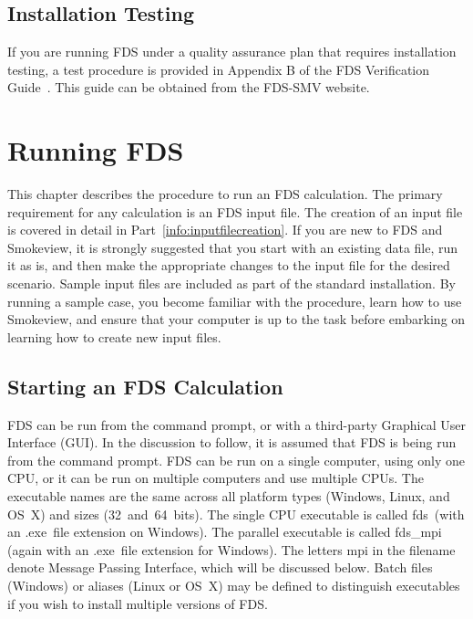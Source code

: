 \documentclass[11pt]{book}
\begin{document}
\section{Installation Testing}

If you are running FDS under a quality assurance plan that requires installation testing, a test procedure is provided in Appendix B of the FDS Verification Guide~\cite{FDS_Verification_Guide}.  This guide can be obtained from the FDS-SMV website.



\chapter{Running FDS}
\label{info:runningFDS}

This chapter describes the procedure to run an FDS calculation. The primary requirement for any calculation is an FDS input file. The creation of an input file is covered in detail in Part~\ref{info:inputfilecreation}. If you are new to FDS and Smokeview, it is strongly suggested that you start with an existing data file, run it as is, and then make the appropriate changes to the input file for the desired scenario. Sample input files are included as part of the standard installation. By running a sample case, you become familiar with the procedure, learn how to use Smokeview, and ensure that your computer is up to the task before embarking on learning how to create new input files.



\section{Starting an FDS Calculation}

FDS can be run from the command prompt, or with a third-party Graphical User Interface (GUI). In the discussion to follow, it is assumed that FDS is being run from the command prompt. FDS can be
run on a single computer, using only one CPU, or it can be run on multiple computers and use multiple CPUs. The executable names are the same across all platform types (Windows, Linux, and OS~X) and
sizes (32~and~64~bits). The single CPU executable is called {\ct fds}\ (with an {\ct .exe}\ file extension on Windows).  The parallel executable is called {\ct fds\_mpi} (again with an {\ct .exe}\ file extension for Windows). The letters {\ct mpi} in the filename denote Message Passing Interface, which will be discussed below.  Batch files (Windows) or aliases (Linux or OS~X) may be defined to distinguish executables if you wish to install multiple versions of FDS.
\end{document}

